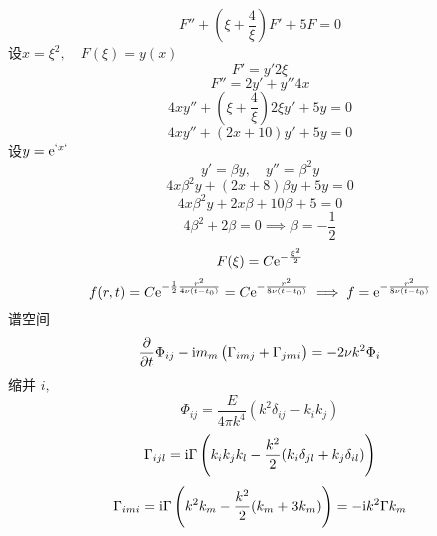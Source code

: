 \documentclass[12pt]{ctexart}
\begin{document}
\begin{equation}
   F'' + \left( \xi + \frac{4}{\xi} \right) F' + 5F = 0
\end{equation}
设$x = \xi^2,\quad F(\xi) = y(x)$
\begin{equation}
   F' = y' 2\xi
\end{equation}
\begin{equation}
   F'' = 2y' + y'' 4x
\end{equation}
\begin{equation}
   4xy'' + \left( \xi + \frac{4}{\xi} \right) 2\xi y' + 5y = 0
\end{equation}
\begin{equation}
   4xy'' + (2x + 10)y' + 5y = 0
\end{equation}
设$y=\mathrm{e}^{` x`}$
\begin{equation}
   y' = \beta y,\quad y'' = \beta^2 y
\end{equation}
\begin{equation}
   4x\beta^2 y + (2x+8) \beta y + 5y =0
\end{equation}
\begin{equation}
   4x\beta^2 y + 2x\beta + 10\beta + 5 = 0
\end{equation}
\begin{equation}
   4\beta^2 + 2\beta = 0 \implies \beta = - \frac{1}{2}
\end{equation}
\begin{equation}
   F(\xi) = C \mathrm{e}^{-\frac{\xi^2}{2}}
\end{equation}
\begin{equation}
   f(r,t) = C \mathrm{e}^{-\frac{1}{2} \frac{r^2}{4\nu(t-t_0)}} = C \mathrm{e}^{-\frac{r^2}{8\nu(t-t_0)}} \implies f = \mathrm{e}^{-\frac{r^2}{8\nu(t-t_0)}}
\end{equation}
谱空间
\begin{equation}
   \frac{\partial }{\partial t} \Phi_{ij} - \mathrm{i} m_m \left( \Gamma_{imj} + \Gamma_{jmi} \right) = -2 \nu k^2 \Phi_{i} 
\end{equation}
缩并 $i,$
\begin{equation}
   \Phi_{ij} = \frac{E}{4\pi k^4}(k^2\delta_{ij}-k_i k_j)
\end{equation}
\begin{equation}
   \Gamma_{ijl} = \mathrm{i} \Gamma \left( k_i k_j k_l - \frac{k^2}{2} (k_i\delta_{jl} + k_j \delta_{il}) \right) 
\end{equation}
\begin{equation}
   \Gamma_{imi} = \mathrm{i} \Gamma \left( k^2k_m - \frac{k^2}{2} (k_m + 3k_m) \right) = - \mathrm{i} k^2 \Gamma k_m
\end{equation}
\end{document}
